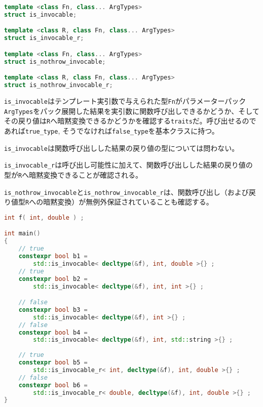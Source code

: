 \bgroup
\begin{lstlisting}[language=C++]
template <class Fn, class... ArgTypes>
struct is_invocable;

template <class R, class Fn, class... ArgTypes>
struct is_invocable_r;

template <class Fn, class... ArgTypes>
struct is_nothrow_invocable;

template <class R, class Fn, class... ArgTypes>
struct is_nothrow_invocable_r;
\end{lstlisting}
\egroup

\lstinline!is_invocable!はテンプレート実引数で与えられた型\lstinline!Fn!がパラメーターパック\lstinline!ArgTypes!をパック展開した結果を実引数に関数呼び出しできるかどうか、そしてその戻り値は\lstinline!R!へ暗黙変換できるかどうかを確認する\lstinline!traits!だ。呼び出せるのであれば\lstinline!true_type!,
そうでなければ\lstinline!false_type!を基本クラスに持つ。

\lstinline!is_invocable!は関数呼び出しした結果の戻り値の型については問わない。

\lstinline!is_invocable_r!は呼び出し可能性に加えて、関数呼び出しした結果の戻り値の型が\lstinline!R!へ暗黙変換できることが確認される。

\lstinline!is_nothrow_invocable!と\lstinline!is_nothrow_invocable_r!は、関数呼び出し（および戻り値型\lstinline!R!への暗黙変換）が無例外保証されていることも確認する。

\begin{lstlisting}[language=C++]
int f( int, double ) ;

int main()
{
    // true
    constexpr bool b1 =
        std::is_invocable< decltype(&f), int, double >{} ;
    // true
    constexpr bool b2 =
        std::is_invocable< decltype(&f), int, int >{} ;

    // false
    constexpr bool b3 =
        std::is_invocable< decltype(&f), int >{} ;
    // false
    constexpr bool b4 =
        std::is_invocable< decltype(&f), int, std::string >{} ;
    
    // true
    constexpr bool b5 = 
        std::is_invocable_r< int, decltype(&f), int, double >{} ;
    // false
    constexpr bool b6 =
        std::is_invocable_r< double, decltype(&f), int, double >{} ;
}
\end{lstlisting}

